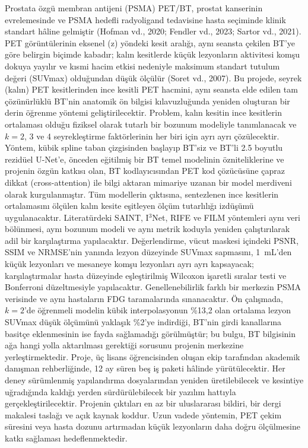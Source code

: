 \documentclass[11pt,a4paper]{article}
\begin{document}
Prostata özgü membran antijeni (PSMA) PET/BT, prostat kanserinin evrelemesinde ve PSMA hedefli
radyoligand tedavisine hasta seçiminde klinik standart hâline gelmiştir (Hofman vd., 2020;
Fendler vd., 2023; Sartor vd., 2021). PET görüntülerinin eksenel (z) yöndeki kesit aralığı, aynı
seansta çekilen BT'ye göre belirgin biçimde kabadır; kalın kesitlerde küçük lezyonların aktivitesi
komşu dokuya yayılır ve kısmi hacim etkisi nedeniyle maksimum standart tutulum değeri (SUVmax)
olduğundan düşük ölçülür (Soret vd., 2007). Bu projede, seyrek (kalın) PET kesitlerinden ince
kesitli PET hacmini, aynı seansta elde edilen tam çözünürlüklü BT'nin anatomik ön bilgisi
kılavuzluğunda yeniden oluşturan bir derin öğrenme yöntemi geliştirilecektir. Problem, kalın
kesitin ince kesitlerin ortalaması olduğu fiziksel olarak tutarlı bir bozunum modeliyle
tanımlanacak ve $k = 2$, 3 ve 4 seyrekleştirme faktörlerinin her biri için ayrı ayrı
çözülecektir. Yöntem, kübik spline taban çizgisinden başlayıp BT'siz ve BT'li 2.5 boyutlu
rezidüel U-Net'e, önceden eğitilmiş bir BT temel modelinin özniteliklerine ve projenin özgün
katkısı olan, BT kodlayıcısından PET kod çözücüsüne çapraz dikkat (cross-attention) ile bilgi
aktaran mimariye uzanan bir model merdiveni olarak kurgulanmıştır. Tüm modellerin çıktısına,
sentezlenen ince kesitlerin ortalamasını ölçülen kalın kesite eşitleyen ölçüm tutarlılığı
izdüşümü uygulanacaktır. Literatürdeki SAINT, I$^3$Net, RIFE ve FILM yöntemleri aynı veri
bölünmesi, aynı bozunum modeli ve aynı metrik koduyla yeniden çalıştırılarak adil bir
karşılaştırma yapılacaktır. Değerlendirme, vücut maskesi içindeki PSNR, SSIM ve NRMSE'nin
yanında lezyon düzeyinde SUVmax sapmasını, 1~mL'den küçük lezyonları ve mesaneye komşu
lezyonları ayrı ayrı kapsayacak; karşılaştırmalar hasta düzeyinde eşleştirilmiş Wilcoxon
işaretli sıralar testi ve Bonferroni düzeltmesiyle yapılacaktır. Genellenebilirlik farklı bir
merkezin PSMA verisinde ve aynı hastaların FDG taramalarında sınanacaktır. Ön çalışmada,
$k = 2$'de öğrenmeli modelin kübik interpolasyonun \%13,2 olan ortalama lezyon SUVmax düşük
ölçümünü yaklaşık \%2'ye indirdiği, BT'nin girdi kanallarına basitçe eklenmesinin ise fayda
sağlamadığı görülmüştür; bu bulgu, BT bilgisinin ağa hangi yolla aktarılması gerektiği sorusunu
projenin merkezine yerleştirmektedir. Proje, üç lisans öğrencisinden oluşan ekip tarafından
akademik danışman rehberliğinde, 12 ay süren beş iş paketi hâlinde yürütülecektir. Her deney
sürümlenmiş yapılandırma dosyalarından yeniden üretilebilecek ve kesintiye uğradığında kaldığı
yerden sürdürülebilecek bir yazılım hattıyla gerçekleştirilecektir. Projenin çıktıları en az bir
uluslararası bildiri, bir dergi makalesi taslağı ve açık kaynak koddur. Uzun vadede yöntemin, PET
çekim süresini veya hasta dozunu artırmadan küçük lezyonların daha doğru ölçülmesine katkı
sağlaması hedeflenmektedir.
\end{document}
